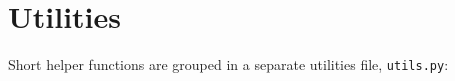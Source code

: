 \section{Utilities}
Short helper functions are grouped in a separate utilities file, \texttt{utils.py}:

